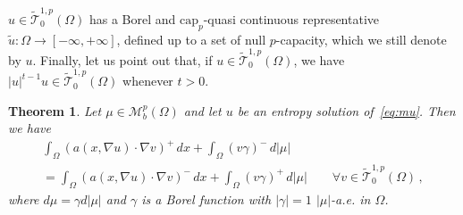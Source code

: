 \documentclass[twoside,reqno]{amsart}
\numberwithin{equation}{section}
\newtheorem{thm}{Theorem}[section]
\theoremstyle{definition}
\begin{document}
$u\in\widetilde{\mathcal{T}}^{1,p}_0(\Omega)$ has a Borel and
$\mathrm{cap}_p$-quasi continuous representative
$\tilde{u}:\Omega\rightarrow[-\infty,+\infty]$, defined up to 
a set of null $p$-capacity, which we still denote by $u$.
Finally, let us point out that, if 
$u\in \widetilde{\mathcal{T}}^{1,p}_0(\Omega)$, we have 
$|u|^{t-1} u \in \widetilde{\mathcal{T}}^{1,p}_0(\Omega)$ 
whenever $t>0$.
%
\begin{thm}
\label{thm:bb}
Let $\mu\in \mathcal{M}_b^p(\Omega)$ and let $u$ be an 
entropy solution of~\eqref{eq:mu}.
Then we have
\begin{multline}
\label{eq:bb}
\int_\Omega (a(x,\nabla u)\cdot\nabla v)^+\,dx 
+ \int_\Omega (v \gamma)^-\,d|\mu| \\
= \int_\Omega (a(x,\nabla u)\cdot\nabla v)^-\,dx 
+ \int_\Omega (v \gamma)^+\,d|\mu|
\qquad\forall v\in \widetilde{\mathcal{T}}^{1,p}_0(\Omega)\,,
\end{multline}
where $d\mu = \gamma d|\mu|$ and $\gamma$ is a Borel function
with $|\gamma|=1$ $|\mu|$-a.e. in $\Omega$.
\end{thm}
%
\end{document}

